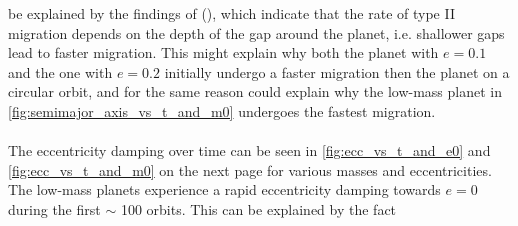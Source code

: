       be explained by the findings of 
      \citeauthor{Kanagawa_2018} (\citeyear{Kanagawa_2018}), which indicate 
      that the rate of type II migration depends on the depth of the gap 
      around the planet, i.e. shallower gaps lead to faster migration. This 
      might explain why both the planet with $e=0.1$ and the one with $e=0.2$ 
      initially undergo a faster migration then the planet on a circular orbit,
      and for the same reason could explain why the low-mass planet in 
      \autoref{fig:semimajor_axis_vs_t_and_m0} undergoes the fastest 
      migration.
      \\
      \\
      The eccentricity damping over time can be seen in 
      \autoref{fig:ecc_vs_t_and_e0} and \autoref{fig:ecc_vs_t_and_m0} 
      on the next page for various masses and eccentricities. 
      The 
      low-mass planets experience a rapid eccentricity damping towards $e=0$ 
      during the first $\sim$ 100 orbits. This can be explained by the fact 
